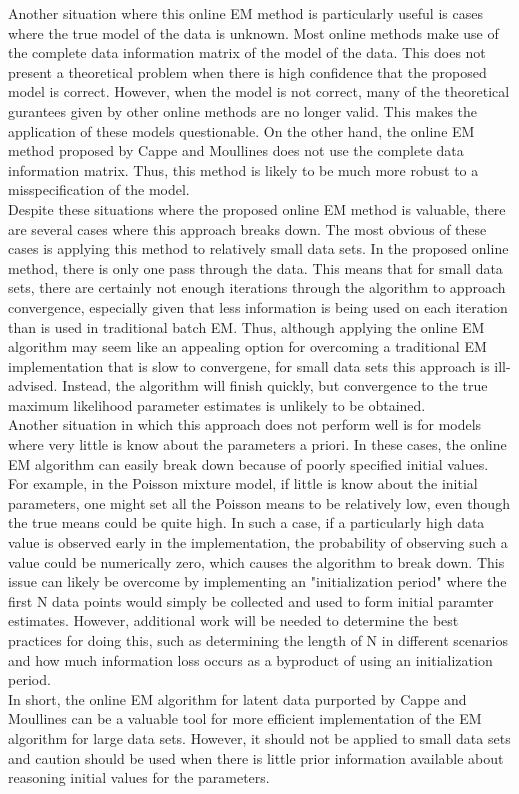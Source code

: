 \documentclass[12pt]{article}
\begin{document}
Another situation where this online EM method is particularly useful is cases where the true model of the data is unknown. Most online methods make use of the complete data information matrix of the model of the data. This does not present a theoretical problem when there is high confidence that the proposed model is correct. However, when the model is not correct, many of the theoretical gurantees given by other online methods are no longer valid. This makes the application of these models questionable. On the other hand, the online EM method proposed by Cappe and Moullines does not use the complete data information matrix. Thus, this method is likely to be much more robust to a misspecification of the model. \\

Despite these situations where the proposed online EM method is valuable, there are several cases where this approach breaks down. The most obvious of these cases is applying this method to relatively small data sets. In the proposed online method, there is only one pass through the data. This means that for small data sets, there are certainly not enough iterations through the algorithm to approach convergence, especially given that less information is being used on each iteration than is used in traditional batch EM. Thus, although applying the online EM algorithm may seem like an appealing option for overcoming a traditional EM implementation that is slow to convergene, for small data sets this approach is ill-advised. Instead, the algorithm will finish quickly, but convergence to the true maximum likelihood parameter estimates is unlikely to be obtained.\\

Another situation in which this approach does not perform well is for models where very little is know about the parameters a priori. In these cases, the online EM algorithm can easily break down because of poorly specified initial values. For example, in the Poisson mixture model, if little is know about the initial parameters, one might set all the Poisson means to be relatively low, even though the true means could be quite high. In such a case, if a particularly high data value is observed early in the implementation, the probability of observing such a value could be numerically zero, which causes the algorithm to break down. This issue can likely be overcome by implementing an "initialization period" where the first N data points would simply be collected and used to form initial paramter estimates. However, additional work will be needed to determine the best practices for doing this, such as determining the length of N in different scenarios and how much information loss occurs as a byproduct of using an initialization period. \\

In short, the online EM algorithm for latent data purported by Cappe and Moullines can be a valuable tool for more efficient implementation of the EM algorithm for large data sets. However, it should not be applied to small data sets and caution should be used when there is little prior information available about reasoning initial values for the parameters.
\end{document}
